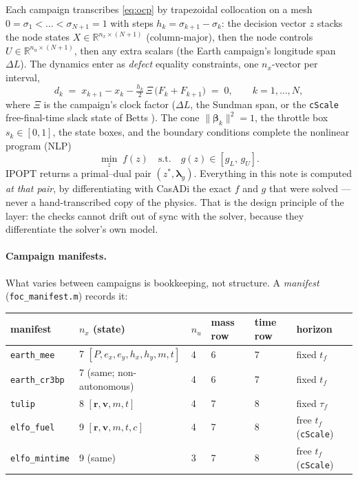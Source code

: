 \documentclass[11pt]{article}
\newcommand{\vlam}{\boldsymbol{\lambda}}
\newcommand{\vbeta}{\boldsymbol{\beta}}
\newcommand{\file}[1]{\texttt{#1}}
\newcommand{\code}[1]{\texttt{#1}}
\begin{document}
Each campaign transcribes \eqref{eq:ocp} by trapezoidal collocation on a mesh
$0=\sigma_1<\dots<\sigma_{N+1}=1$ with steps $h_k=\sigma_{k+1}-\sigma_k$: the
decision vector $z$ stacks the node states
$X\in\mathbb R^{n_x\times(N+1)}$ (column-major), then the node controls
$U\in\mathbb R^{n_u\times(N+1)}$, then any extra scalars (the Earth campaign's
longitude span $\Delta L$). The dynamics enter as \emph{defect} equality
constraints, one $n_x$-vector per interval,
\begin{equation}
d_k \;=\; x_{k+1}-x_k-\tfrac{h_k}{2}\,\Xi\,\bigl(F_k+F_{k+1}\bigr) \;=\;0,
\qquad k=1,\dots,N,
\label{eq:defect}
\end{equation}
where $\Xi$ is the campaign's clock factor ($\Delta L$, the Sundman span, or
the \code{cScale} free-final-time slack state of Betts \cite{Betts2010}). The cone $\|\vbeta_k\|^2=1$, the throttle box
$s_k\in[0,1]$, the state boxes, and the boundary conditions complete the
nonlinear program (NLP)
\begin{equation}
\min_z\; f(z) \quad\text{s.t.}\quad g(z)\in[g_L,\,g_U].
\label{eq:nlp}
\end{equation}
IPOPT returns a primal--dual pair $(z^\ast,\vlam_g)$. Everything in this note
is computed \emph{at that pair}, by differentiating with CasADi the exact
$f$ and $g$ that were solved --- never a hand-transcribed copy of the physics.
That is the design principle of the layer: the checks cannot drift out of sync
with the solver, because they differentiate the solver's own model.

\paragraph{Campaign manifests.}
What varies between campaigns is bookkeeping, not structure. A
\emph{manifest} (\file{foc\_manifest.m}) records it:

\begin{center}
\small
\begin{tabular}{@{}llllll@{}}
\toprule
manifest & $n_x$ (state) & $n_u$ & mass row & time row & horizon \\
\midrule
\code{earth\_mee}     & 7 $[P,e_x,e_y,h_x,h_y,m,t]$ & 4 & 6 & 7 & fixed $t_f$ \\
\code{earth\_cr3bp}   & 7 (same; non-autonomous)      & 4 & 6 & 7 & fixed $t_f$ \\
\code{tulip}          & 8 $[\mathbf r,\mathbf v,m,t]$ & 4 & 7 & 8 & fixed $\tau_f$ \\
\code{elfo\_fuel}     & 9 $[\mathbf r,\mathbf v,m,t,c]$ & 4 & 7 & 8 & free $t_f$ (\code{cScale}) \\
\code{elfo\_mintime}  & 9 (same)                      & 3 & 7 & 8 & free $t_f$ (\code{cScale}) \\
\bottomrule
\end{tabular}
\end{center}
\end{document}
